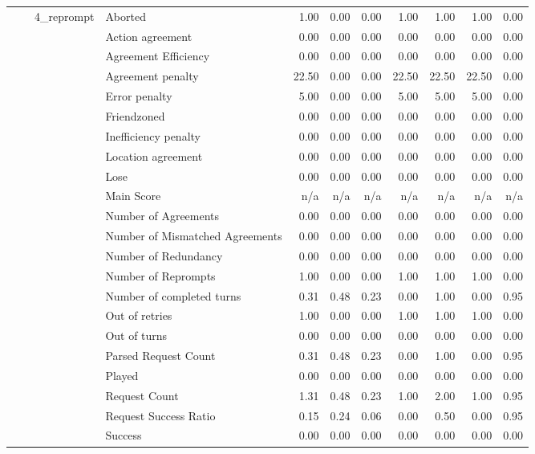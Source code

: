 \begin{tabular}{llllrrrrrrr}
\cline{3-11}
 &  & \multirow[t]{27}{*}{4_reprompt} & Aborted & 1.00 & 0.00 & 0.00 & 1.00 & 1.00 & 1.00 & 0.00 \\
 &  &  & Action agreement & 0.00 & 0.00 & 0.00 & 0.00 & 0.00 & 0.00 & 0.00 \\
 &  &  & Agreement Efficiency & 0.00 & 0.00 & 0.00 & 0.00 & 0.00 & 0.00 & 0.00 \\
 &  &  & Agreement penalty & 22.50 & 0.00 & 0.00 & 22.50 & 22.50 & 22.50 & 0.00 \\
 &  &  & Error penalty & 5.00 & 0.00 & 0.00 & 5.00 & 5.00 & 5.00 & 0.00 \\
 &  &  & Friendzoned & 0.00 & 0.00 & 0.00 & 0.00 & 0.00 & 0.00 & 0.00 \\
 &  &  & Inefficiency penalty & 0.00 & 0.00 & 0.00 & 0.00 & 0.00 & 0.00 & 0.00 \\
 &  &  & Location agreement & 0.00 & 0.00 & 0.00 & 0.00 & 0.00 & 0.00 & 0.00 \\
 &  &  & Lose & 0.00 & 0.00 & 0.00 & 0.00 & 0.00 & 0.00 & 0.00 \\
 &  &  & Main Score & n/a & n/a & n/a & n/a & n/a & n/a & n/a \\
 &  &  & Number of Agreements & 0.00 & 0.00 & 0.00 & 0.00 & 0.00 & 0.00 & 0.00 \\
 &  &  & Number of Mismatched Agreements & 0.00 & 0.00 & 0.00 & 0.00 & 0.00 & 0.00 & 0.00 \\
 &  &  & Number of Redundancy & 0.00 & 0.00 & 0.00 & 0.00 & 0.00 & 0.00 & 0.00 \\
 &  &  & Number of Reprompts & 1.00 & 0.00 & 0.00 & 1.00 & 1.00 & 1.00 & 0.00 \\
 &  &  & Number of completed turns & 0.31 & 0.48 & 0.23 & 0.00 & 1.00 & 0.00 & 0.95 \\
 &  &  & Out of retries & 1.00 & 0.00 & 0.00 & 1.00 & 1.00 & 1.00 & 0.00 \\
 &  &  & Out of turns & 0.00 & 0.00 & 0.00 & 0.00 & 0.00 & 0.00 & 0.00 \\
 &  &  & Parsed Request Count & 0.31 & 0.48 & 0.23 & 0.00 & 1.00 & 0.00 & 0.95 \\
 &  &  & Played & 0.00 & 0.00 & 0.00 & 0.00 & 0.00 & 0.00 & 0.00 \\
 &  &  & Request Count & 1.31 & 0.48 & 0.23 & 1.00 & 2.00 & 1.00 & 0.95 \\
 &  &  & Request Success Ratio & 0.15 & 0.24 & 0.06 & 0.00 & 0.50 & 0.00 & 0.95 \\
 &  &  & Success & 0.00 & 0.00 & 0.00 & 0.00 & 0.00 & 0.00 & 0.00 \\

\end{tabular}
